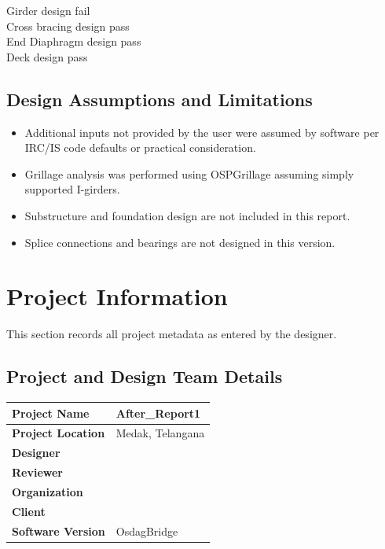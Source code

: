 \documentclass[12pt,a4paper]{report}
\numberwithin{table}{chapter}
\numberwithin{figure}{chapter}
\begin{document}
\noindent Girder design fail \\
Cross bracing design pass \\
End Diaphragm design pass \\
Deck design pass

\section*{Design Assumptions and Limitations}
\label{sec:assumptions}

\begin{itemize}
\item Additional inputs not provided by the user were assumed by software per IRC/IS code defaults or practical consideration.
\item Grillage analysis was performed using OSPGrillage assuming simply supported I-girders.
\item Substructure and foundation design are not included in this report.
\item Splice connections and bearings are not designed in this version.
\end{itemize}

\titleformat{\chapter}[block]{\normalfont\Large\bfseries\centering}{\thechapter}{1em}{}
\titlespacing*{\chapter}{0pt}{-30pt}{10pt}


\chapter{Project Information}

This section records all project metadata as entered by the designer.

\section{Project and Design Team Details}
\label{sec:project-details}

\begin{tabular}{|L{5.5cm}|L{8.5cm}|}
\hline
\textbf{Project Name} & After\_\allowbreak{}Report1 \\
\hline
\textbf{Project Location} & Medak, Telangana \\
\hline
\textbf{Designer} &  \\
\hline
\textbf{Reviewer} &  \\
\hline
\textbf{Organization} &  \\
\hline
\textbf{Client} &  \\
\hline
\textbf{Software Version} & OsdagBridge \\
\hline
\end{tabular}
\end{document}
